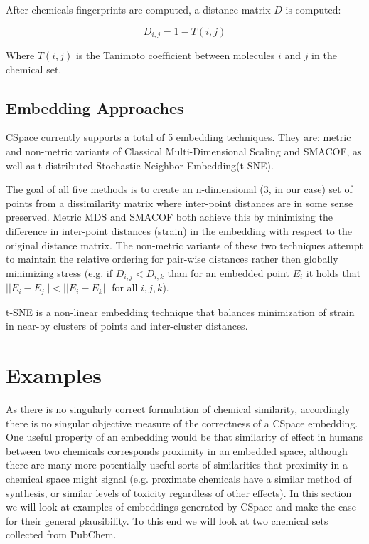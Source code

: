 \documentclass[12pt]{article}
\begin{document}
After chemicals fingerprints are computed, a distance matrix $D$ is computed:

\begin{equation}
  D_{i,j} = 1 - T(i,j)
\end{equation}

Where $T(i,j)$ is the Tanimoto coefficient between molecules $i$ and $j$ in the chemical set.

\subsection{Embedding Approaches}
CSpace currently supports a total of 5 embedding techniques. They are: metric and non-metric variants of Classical Multi-Dimensional Scaling and SMACOF, as well as t-distributed Stochastic Neighbor Embedding(t-SNE).

The goal of all five methods is to create an n-dimensional (3, in our case) set of points from a dissimilarity matrix where inter-point distances are in some sense preserved. Metric MDS and SMACOF both achieve this by minimizing the difference in inter-point distances (strain) in the embedding with respect to the original distance matrix. The non-metric variants of these two techniques attempt to maintain the relative ordering for pair-wise distances rather then globally minimizing stress (e.g. if $D_{i,j} < D_{i,k}$ than for an embedded point $E_i$ it holds that $||E_i - E_j|| < ||E_i - E_k||$ for all $i, j, k$).

t-SNE is a non-linear embedding technique that balances minimization of strain in near-by clusters of points and inter-cluster distances\cite{maaten2008visualizing}.

\section{Examples}
As there is no singularly correct formulation of chemical similarity, accordingly there is no singular objective measure of the correctness of a CSpace embedding. One useful property of an embedding would be that similarity of effect in humans between two chemicals corresponds proximity in an embedded space, although there are many more potentially useful sorts of similarities that proximity in a chemical space might signal (e.g. proximate chemicals have a similar method of synthesis, or similar levels of toxicity regardless of other effects). In this section we will look at examples of embeddings generated by CSpace and make the case for their general plausibility. To this end we will look at two chemical sets collected from PubChem.
\end{document}
